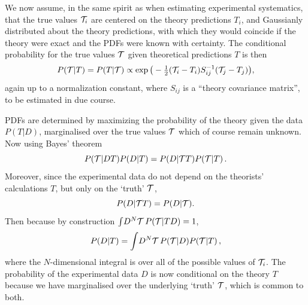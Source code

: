 We now
assume, in the same spirit as when estimating experimental
systematics, that the true values ${\cal T}_i$ are centered on the theory
predictions $T_i$, and Gaussianly distributed
about the theory predictions, with which they would coincide 
if the theory were exact and the PDFs were known with certainty.
%
The conditional probability for the
true values ${\cal T}$ given theoretical predictions $T$  is then
\begin{equation}\label{eq:PT}
P({\cal T}|T)=P(T|{\cal T}) \propto \exp\big(-\hbox{${{1}\over {2}}$} ({\cal T}_i-T_i)S_{ij}^{-1}({\cal T}_j-T_j)\big),
\end{equation}
again up to a normalization constant, where $S_{ij}$ is a ``theory
covariance matrix'', to be estimated in due course. 

PDFs are determined by  maximizing the probability of the theory given
the data $P(T|D)$, marginalised over the true values ${\cal T}$ which of
course remain unknown.
%
Now using Bayes' theorem 
\begin{equation}
  \label{eq:Bayes}
P({\cal T}|DT)P(D|T)=P(D|{\cal T} T)P({\cal T}|T) \, .
\end{equation}
Moreover, since the experimental data do not depend on 
the theorists' calculations $T$, but only on the `truth' ${\cal T}$,              
\begin{equation}\label{eq:indy}
P(D|{\cal T} T)=P(D|{\cal T}).
\end{equation} 
Then because by construction $\int \!D^{N}{\cal T}\, P({\cal T}|TD)=1$,
\begin{equation}\label{eq:margin}
P(D|T) = \int \!D^{N}{\cal T}\, P({\cal T}|D)P({\cal T}|T) \, ,
\end{equation}
where the $N$-dimensional integral is over all of the possible values
of ${\cal T}_i$. The probability of the experimental data $D$ is now conditional 
on the theory $T$ because we have marginalised over the underlying `truth' 
${\cal T}$, which is common to both.

